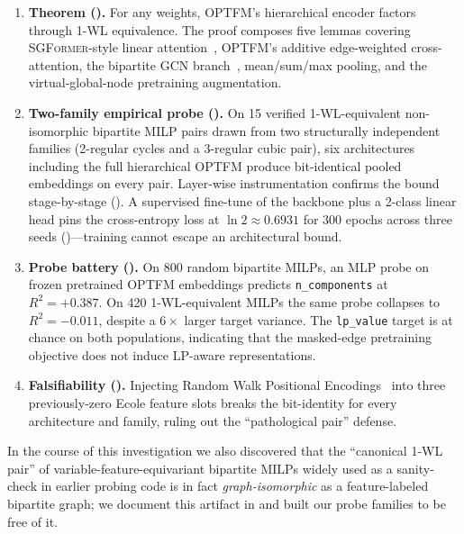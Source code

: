\documentclass[11pt]{article}
\theoremstyle{plain}
\theoremstyle{definition}
\theoremstyle{remark}
\newcommand{\optfm}{\textsc{OPTFM}}
\newcommand{\sgformer}{\textsc{SGFormer}}
\begin{document}
\begin{enumerate}[leftmargin=18pt, topsep=0pt, itemsep=1pt]
    \item \textbf{Theorem ().} For any weights, \optfm{}'s
    hierarchical encoder factors through 1-WL equivalence. The proof composes
    five lemmas covering \sgformer{}-style linear attention~\cite{wu2023sgformer},
    \optfm{}'s additive edge-weighted cross-attention, the bipartite GCN
    branch~\cite{gasse2019exact}, mean/sum/max pooling, and the
    virtual-global-node pretraining augmentation.

    \item \textbf{Two-family empirical probe ().} On 15 verified
    1-WL-equivalent non-isomorphic bipartite MILP pairs drawn from two
    structurally independent families (2-regular cycles and a 3-regular cubic
    pair), six architectures including the full hierarchical \optfm{} produce
    bit-identical pooled embeddings on every pair. Layer-wise instrumentation
    confirms the bound stage-by-stage (). A supervised
    fine-tune of the backbone plus a 2-class linear head pins the cross-entropy
    loss at $\ln 2 \approx 0.6931$ for 300 epochs across three seeds
    ()---training cannot escape an architectural bound.

    \item \textbf{Probe battery ().} On 800 random bipartite
    MILPs, an MLP probe on frozen pretrained \optfm{} embeddings predicts
    \texttt{n\_components} at $R^2={+}0.387$. On 420 1-WL-equivalent MILPs the
    same probe collapses to $R^2={-}0.011$, despite a $6{\times}$ larger target
    variance. The \texttt{lp\_value} target is at chance on both populations,
    indicating that the masked-edge pretraining objective does not induce
    LP-aware representations.

    \item \textbf{Falsifiability ().} Injecting Random Walk
    Positional Encodings~\cite{dwivedi2022rwpe} into three previously-zero
    Ecole feature slots breaks the bit-identity for every architecture and
    family, ruling out the ``pathological pair'' defense.
\end{enumerate}

In the course of this investigation we also discovered that the ``canonical
1-WL pair'' of variable-feature-equivariant bipartite MILPs widely used as a
sanity-check in earlier probing code is in fact \emph{graph-isomorphic} as a
feature-labeled bipartite graph; we document this artifact in
 and built our probe families to be free of it.
\end{document}
